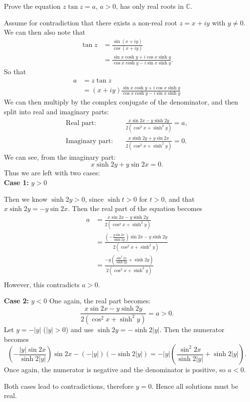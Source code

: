 \documentclass[12pt]{article}
\begin{document}
\begin{statement}[13]
  Prove the equation $z \tan z = a$, $a > 0$, has only real roots in $\mathbb{C}$.
\end{statement}
\begin{newproof}
    Assume for contradiction that there exists a non-real root $ z = x + iy $ with $ y \neq 0 $. We can then also note that
    \begin{align*}
        \tan z &= \frac{\sin(x + iy)}{\cos(x + iy)} \\
        &= \frac{\sin x \cosh y + i \cos x \sinh y}{\cos x \cosh y - i \sin x \sinh y}.
    \end{align*}
    So that 
    \begin{align*}
        a &= z \tan z \\
        &= (x + iy)\frac{\sin x \cosh y + i \cos x \sinh y}{\cos x \cosh y - i \sin x \sinh y}
    \end{align*}
    We can then multiply by the complex conjugate of the denominator, and then split into real and imaginary parts:
    \begin{align*}
        \text{Real part:} & \quad \frac{x \sin 2x - y \sinh 2y}{2(\cos^2 x + \sinh^2 y)} = a, \\
        \text{Imaginary part:} & \quad \frac{x \sinh 2y + y \sin 2x}{2(\cos^2 x + \sinh^2 y)} = 0.
    \end{align*}
    We can see, from the imaginary part:
    $$ x \sinh 2y + y \sin 2x = 0. $$
    Thus we are left with two cases: \\
    \noindent \textbf{Case 1:} $ y > 0 $
    \par Then we know $ \sinh 2y > 0 $, since $ \sinh t > 0 $ for $ t > 0 $, and that $ x \sinh 2y = -y \sin 2x $.
    Then the real part of the equation becomes 
    \begin{align*}
        a &= \frac{x \sin 2x - y \sinh 2y}{2(\cos^2 x + \sinh^2 y)} \\ 
        &= \frac{\left( - \frac{y \sin 2x}{\sinh 2y}\right) \sin 2x - y \sinh 2y}{2(\cos^2 x + \sinh^2 y)} \\
        &= \frac{-y \left( \frac{\sin^2 2x}{\sinh 2y} + \sinh 2y \right)}{2(\cos^2 x + \sinh^2 y)} \\
    \end{align*}
    However, this contradicts $a > 0$. 
    
    \noindent \textbf{Case 2:} $ y < 0 $
    One again, the real part becomes:
    $$ \frac{x \sin 2x - y \sinh 2y}{2(\cos^2 x + \sinh^2 y)} = a > 0. $$
    Let $ y = -|y| $ ($ |y| > 0 $) and use $ \sinh 2y = -\sinh 2|y| $. Then the numerator becomes
    $$ \left(-\frac{|y| \sin 2x}{\sinh 2|y|}\right)\sin 2x - (-|y|)(-\sinh 2|y|) = -|y|\left(\frac{\sin^2 2x}{\sinh 2|y|} + \sinh 2|y|\right). $$
    Once again, the numerator is negative and the denominator is positive, so $a < 0$. 
    \par Both cases lead to contradictions, therefore $ y = 0 $. Hence all solutions must be real.
\end{newproof}
\end{document}
